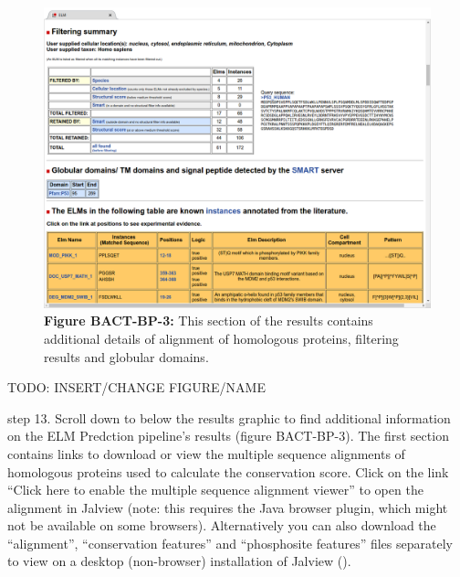 \begin{figure}[h!]
\centering
\includegraphics[width=\textwidth]{Figures/TP53_1/elm_results_alignments_filtering_domains.png}
\caption{
\textbf{Figure BACT-BP-3:} This section of the results contains
additional details of alignment of homologous proteins, filtering
results and globular domains.
}
\end{figure}

TODO: INSERT/CHANGE FIGURE/NAME

step 13. Scroll down to below the results graphic to find additional
information on the ELM Predction pipeline's results (figure BACT-BP-3).
The first section contains links to download or view the multiple
sequence alignments of homologous proteins used to calculate the
conservation score. Click on the link ``Click here to enable the
multiple sequence alignment viewer'' to open the alignment in Jalview
(note: this requires the Java browser plugin, which might not be
available on some browsers). Alternatively you can also download the
``alignment'', ``conservation features'' and ``phosphosite features''
files separately to view on a desktop (non-browser) installation of
Jalview (\cite{19151095}).


